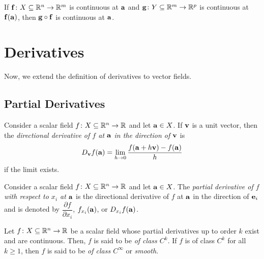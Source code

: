 \documentclass{article}
\begin{document}
\begin{theorem}
  If $\mathbf{f} \colon X \subseteq \mathbb{R}^n \to \mathbb{R}^m$ is continuous at $\mathbf{a}$ and $\mathbf{g} \colon Y \subseteq \mathbb{R}^m \to \mathbb{R}^p$ is continuous at $\mathbf{f}(\mathbf{a})$, then $\mathbf{g} \circ \mathbf{f}$ is continuous at $\mathbf{a}$.
\end{theorem}

\section{Derivatives}

Now, we extend the definition of derivatives to vector fields.

\subsection{Partial Derivatives}

\begin{definition}
  Consider a scalar field $f \colon X \subseteq \mathbb{R}^n \to \mathbb{R}$ and let $\mathbf{a} \in X$.
  If $\mathbf{v}$ is a unit vector, then the \emph{directional derivative of $f$ at $\mathbf{a}$ in the direction of $\mathbf{v}$} is
  \begin{align}
    D_{\mathbf{v}}f(\mathbf{a}) = \lim_{h \to 0} \frac{f(\mathbf{a} + h\mathbf{v}) - f(\mathbf{a})}{h}
  \end{align}
  if the limit exists.
\end{definition}

\begin{definition}
  Consider a scalar field $f \colon X \subseteq \mathbb{R}^n \to \mathbb{R}$ and let $\mathbf{a} \in X$.
  The \emph{partial derivative of $f$ with respect to $x_i$ at $\mathbf{a}$} is
  the directional derivative of $f$ at $\mathbf{a}$ in the direction of $\mathbf{e}_i$ and is denoted by $\dfrac{\partial f}{\partial x_i}$, $f_{x_i}(\mathbf{a})$, or $D_{x_i}f(\mathbf{a})$.
\end{definition}

\begin{definition}
  Let $f \colon X \subseteq \mathbb{R}^n \to \mathbb{R}$ be a scalar field whose partial derivatives up to order $k$ exist and are continuous.
  Then, $f$ is said to be \emph{of class $C^k$}.
  If $f$ is of class $C^k$ for all $k \geq 1$, then $f$ is said to be \emph{of class $C^\infty$} or \emph{smooth}.
\end{definition}
\end{document}
